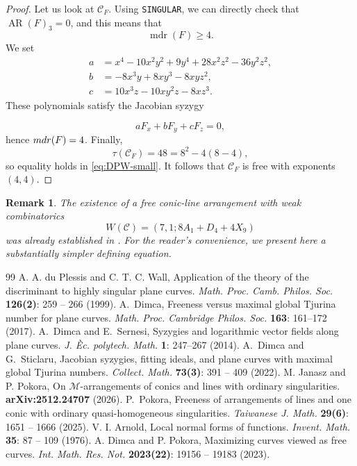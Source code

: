 \documentclass[10pt,a4paper]{amsart}
\newtheorem{remark}[theorem]{Remark}
\newcommand{\mdr}{\operatorname{mdr}}
\newcommand{\AR}{\operatorname{AR}}
\begin{document}
\begin{proof}
Let us look at $\mathcal{C}_{F}$. Using \texttt{SINGULAR}, we can directly check that $\AR(F)_3=0$, and this means that
\[
 \mdr(F)\geq 4.
\]
We set 
\[
\begin{aligned}
a &= x^{4}-10x^{2}y^{2}+9y^{4}
     +28x^{2}z^{2}-36y^{2}z^{2},\\
b &= -8x^{3}y+8xy^{3}-8xyz^{2},\\
c &= 10x^{3}z-10xy^{2}z-8xz^{3}.
\end{aligned}
\]
These polynomials satisfy the Jacobian syzygy

\[
aF_x+bF_y+cF_z=0,
\]
hence ${\rm mdr}(F)=4$.
Finally,
\[
 \tau(\mathcal C_F)=48=8^2-4(8-4),
\]
so equality holds in \eqref{eq:DPW-small}.  It follows that $\mathcal C_F$
is free with exponents $(4,4)$.
\end{proof}

\begin{remark}
The existence of a free conic-line arrangement with weak combinatorics
\[
W(\mathcal{C})=(7,1;8A_1+D_4+4X_9)
\]
was already established in \cite[Theorem~1.3]{PokoraOneConic}. For the reader's convenience, we present here a substantially simpler defining equation.
\end{remark}

\begin{thebibliography}{99}
 A. A. du Plessis and C. T. C. Wall, Application of the theory of the discriminant to highly singular plane curves. \textit{Math. Proc. Camb. Philos. Soc.} \textbf{126(2)}: 259 -- 266 (1999).
 A.~Dimca, Freeness versus maximal global Tjurina number for plane curves. \textit{Math. Proc. Cambridge Philos. Soc.} \textbf{163}: 161--172 (2017).
 A.~Dimca and E.~Sernesi, Syzygies and logarithmic vector fields along plane curves. \textit{J. \`Ec. polytech. Math.} \textbf{1}: 247--267 (2014).
 A.~Dimca and G.~Sticlaru, Jacobian syzygies, fitting ideals, and plane curves with maximal global Tjurina numbers. \textit{Collect. Math.} \textbf{73(3)}: 391 -- 409 (2022).
 M. Janasz and P. Pokora, On $\mathscr{M}$-arrangements of conics and lines with ordinary singularities. \textbf{arXiv:2512.24707} (2026).
 P.~Pokora, Freeness of arrangements of lines and one conic with ordinary quasi-homogeneous singularities. \textit{Taiwanese J. Math.} \textbf{29(6)}: 1651 -- 1666 (2025).
 V. I. Arnold, Local normal forms of functions. \textit{Invent. Math.} \textbf{35}: 87 -- 109 (1976).
 A. Dimca and P. Pokora, Maximizing curves viewed as free curves. \textit{Int. Math. Res. Not.} \textbf{2023(22)}: 19156 -- 19183 (2023).
\end{thebibliography}
\end{document}
